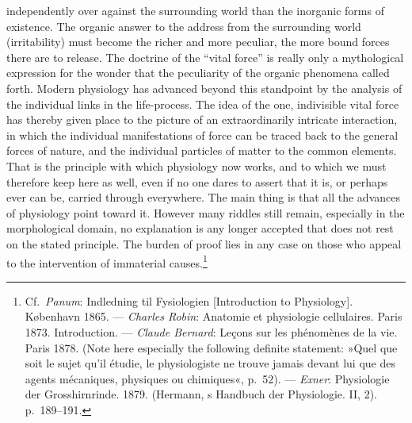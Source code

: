 \documentclass[12pt,a4paper]{book}
\newcommand{\opage}[1]{\marginnote{\footnotesize\textit{[#1]}}}
\begin{document}
independently over against the surrounding world than the inorganic
forms of existence. The organic answer to the address from the
surrounding world (irritability) must become the richer and more
peculiar, the more bound forces there are to release. The doctrine of
the ``vital force'' is really only a mythological expression for the
wonder that the peculiarity of the organic phenomena called forth.
Modern physiology has advanced beyond this standpoint by the analysis of
the individual links in the life-process. The idea of the one,
indivisible vital force has thereby given place to the picture of an
extraordinarily intricate interaction, in which the individual
manifestations of force can be traced back to the general forces of
nature, and the individual particles of matter to the common elements.
That is the principle with which physiology now works, and to which we
must therefore keep here as well, even if no one dares to assert that
it is, or perhaps ever can be, carried through everywhere. The main
thing is that all the advances of physiology point toward it. However
many riddles still
\opage{42}remain, especially in the morphological domain, no explanation
is any longer accepted that does not rest on the stated principle. The
burden of proof lies in any case on those who appeal to the intervention
of immaterial causes.\footnote{Cf.\ \emph{Panum}: Indledning til
Fysiologien [Introduction to Physiology]. København 1865. --- \emph{Charles
Robin}: Anatomie et physiologie cellulaires. Paris 1873. Introduction.
--- \emph{Claude Bernard}: Leçons sur les phénomènes de la vie. Paris
1878. (Note here especially the following definite statement: »Quel que
soit le sujet qu'il étudie, le physiologiste ne trouve jamais devant lui
que des agents mécaniques, physiques ou chimiques«, p.~52). ---
\emph{Exner}: Physiologie der Grosshirnrinde. 1879. (Hermann, s Handbuch
der Physiologie. II, 2). p.~189--191.}
\end{document}
